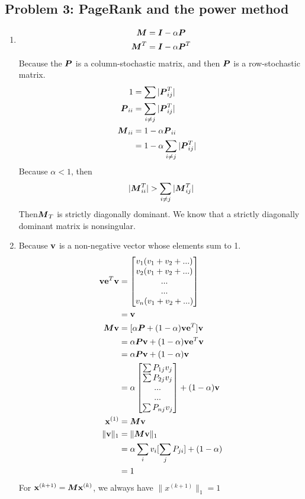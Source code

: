 \documentclass{article}
\begin{document}
\subsection*{{Problem 3: PageRank and the power method}}
\label{}
\begin{enumerate} 
\item 
\begin{align*}
\mM &=\mI-\alpha\mP \\
\mM^T &=\mI-\alpha\mP^T \\
\end{align*} 
Because the $\mP$ is a column-stochastic matrix, and then $\mP$ is a row-stochastic matrix.  
\begin{align*}
1 &= \sum |\mP^T_{ij}| &   \\
\mP_{ii}  & = \sum_{i\neq j} |\mP^T_{ij}| \\
\mM_{ii} & =  1-\alpha\mP_{ii}  \\
& = 1- \alpha\sum_{i\neq j} |\mP^T_{ij}| \\
\end{align*}
Because $\alpha<1$, then 
\begin{align*} 
|\mM^T_{ii}|>\sum_{i\neq j} |\mM^T_{ij}|
\end{align*}
Then$\mM_T$ is strictly diagonally dominant. We know that a strictly diagonally dominant matrix is nonsingular. 

\item 
Because $\vv$ is a non-negative vector whose elements sum to 1. \\
\begin{align*} 
\vv\ve^T\vv &= \bmat{v_1(v_1+v_2+...) \\ v_2(v_1+v_2+...) \\ ... 
\\ ... \\v_n(v_1+v_2+...)} \\
& = \vv \\
\mM\vv &= [\alpha\mP+(1-\alpha)\vv\ve^T]\vv  \\
&= \alpha\mP\vv + (1-\alpha)\vv\ve^T\vv \\
& =  \alpha\mP\vv + (1-\alpha)\vv \\
& = \alpha\bmat{\sum P_{1j} v_j\\ \sum P_{2j}v_j \\ ... \\ ... \\ \sum P_{nj} v_j} + (1-\alpha)\vv \\
\vx^{(1)} &=\mM\vv  \\
\|\vv\|_1 &= \|\mM\vv\|_1 \\
&= \alpha\sum_{i}v_i[\sum_{j}P_{ji}] + (	1-\alpha) \\
& = 1
\end{align*}
For $ \vx^{(k+1)} = \mM\vx^{(k)} $, we always have $\|x^{(k+1)}\|_1 = 1$ \\



\end{enumerate}
\end{document}
